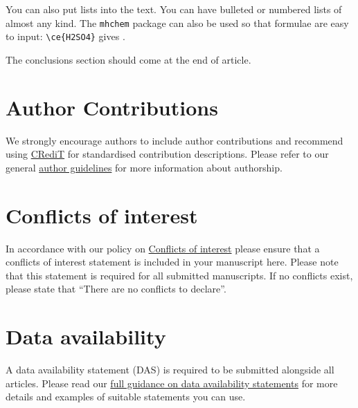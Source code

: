 \documentclass[twoside,twocolumn,9pt]{article}
\begin{document}
You can also put lists into the text. You can have bulleted or numbered lists of almost any kind. 
The \texttt{mhchem} package can also be used so that formulae are easy to input: \texttt{\textbackslash ce\{H2SO4\}} gives . 


The conclusions section should come at the end of article. 

\section*{Author Contributions}
We strongly encourage authors to include author contributions and recommend using \href{https://casrai.org/credit/}{CRediT} for standardised contribution descriptions. Please refer to our general \href{https://www.rsc.org/journals-books-databases/journal-authors-reviewers/author-responsibilities/}{author guidelines} for more information about authorship.

\section*{Conflicts of interest}
In accordance with our policy on \href{https://www.rsc.org/journals-books-databases/journal-authors-reviewers/author-responsibilities/#code-of-conduct}{Conflicts of interest} please ensure that a conflicts of interest statement is included in your manuscript here.  Please note that this statement is required for all submitted manuscripts.  If no conflicts exist, please state that ``There are no conflicts to declare''.

\section*{Data availability}


A data availability statement (DAS) is required to be submitted alongside all articles. Please read our \href{https://www.rsc.org/journals-books-databases/author-and-reviewer-hub/authors-information/prepare-and-format/data-sharing/#dataavailabilitystatements}{full guidance on data availability statements} for more details and examples of suitable statements you can use.




\end{document}
